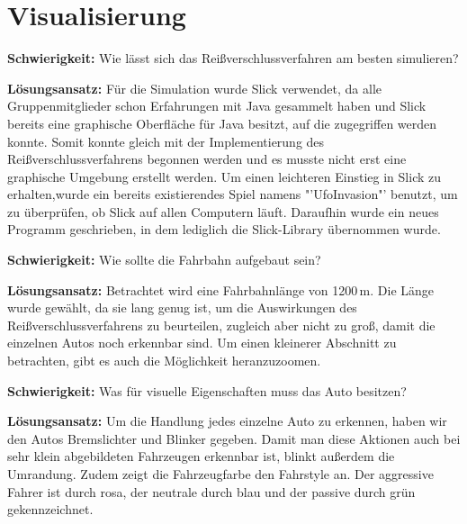 \section{Visualisierung}
\textbf{Schwierigkeit:} Wie lässt sich das Reißverschlussverfahren am besten simulieren?
\begin{addmargin}[25pt]{0pt}
	\item \textbf{Lösungsansatz:} Für die Simulation wurde Slick verwendet, da alle Gruppenmitglieder schon Erfahrungen mit Java gesammelt haben und Slick bereits eine graphische Oberfläche für Java besitzt, auf die zugegriffen werden konnte. Somit konnte gleich mit der Implementierung des Reißverschlussverfahrens begonnen werden und es musste nicht erst eine graphische Umgebung erstellt werden. Um einen leichteren Einstieg in Slick zu erhalten,wurde ein bereits existierendes Spiel namens "'UfoInvasion"' benutzt, um zu überprüfen, ob Slick auf allen Computern läuft. Daraufhin wurde ein neues Programm geschrieben, in dem lediglich die Slick-Library übernommen wurde. \\
\end{addmargin}
\textbf{Schwierigkeit:} Wie sollte die Fahrbahn aufgebaut sein?
\begin{addmargin}[25pt]{0pt}
	\item \textbf{Lösungsansatz:} Betrachtet wird eine Fahrbahnlänge von 1200\,m. Die Länge wurde gewählt, da sie lang genug ist, um die Auswirkungen des Reißverschlussverfahrens zu beurteilen, zugleich aber nicht zu groß, damit die einzelnen Autos noch erkennbar sind. Um einen kleinerer Abschnitt zu betrachten, gibt es auch die Möglichkeit heranzuzoomen.\\
\end{addmargin}
\textbf{Schwierigkeit:} Was für visuelle Eigenschaften muss das Auto besitzen?
\begin{addmargin}[25pt]{0pt}
	\item \textbf{Lösungsansatz:} Um die Handlung jedes einzelne Auto zu erkennen, haben wir den Autos Bremslichter und Blinker gegeben. Damit man diese Aktionen auch bei sehr klein abgebildeten Fahrzeugen erkennbar ist, blinkt außerdem die Umrandung. Zudem zeigt die Fahrzeugfarbe den Fahrstyle an. Der aggressive Fahrer ist durch rosa, der neutrale durch blau und der passive durch grün gekennzeichnet.\\
\end{addmargin}

